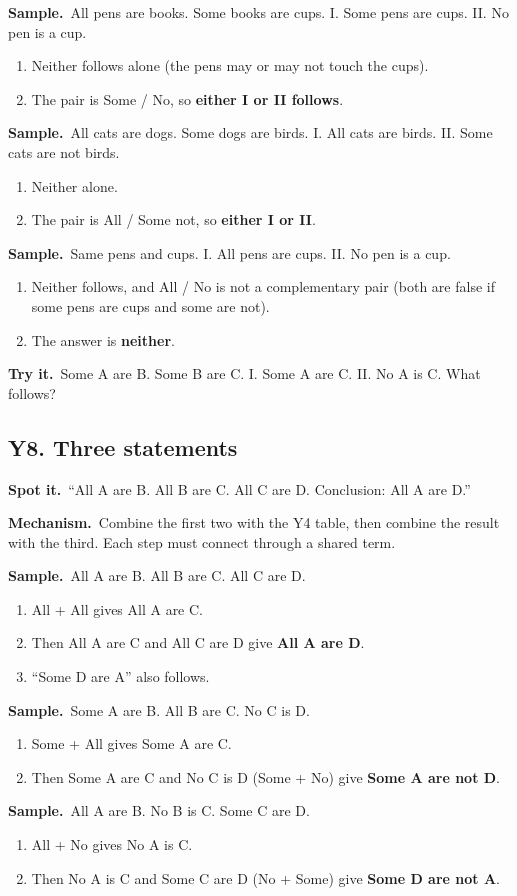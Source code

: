 \documentclass[11pt,a4paper]{article}
\let\oldsubsection\subsection
\renewcommand{\subsection}{\needspace{9\baselineskip}\oldsubsection}
\newcommand{\spot}{\textbf{\color{ember}Spot it.}\ }
\newcommand{\mech}{\textbf{\color{ember}Mechanism.}\ }
\newif\ifkeepsamp
\newcommand{\samp}{\ifkeepsamp\needspace{4\baselineskip}\fi\textbf{\color{ember}Sample.}\ }
\newcommand{\tryit}[1]{\textbf{\color{ember}Try it.}\ #1}
\begin{document}
\samp All pens are books. Some books are cups. I. Some pens are cups. II. No pen is a cup.
\begin{enumerate}
\item Neither follows alone (the pens may or may not touch the cups).
\item The pair is Some / No, so \textbf{either I or II follows}.
\end{enumerate}
\samp All cats are dogs. Some dogs are birds. I. All cats are birds. II. Some cats are not birds.
\begin{enumerate}
\item Neither alone.
\item The pair is All / Some not, so \textbf{either I or II}.
\end{enumerate}
\samp Same pens and cups. I. All pens are cups. II. No pen is a cup.
\begin{enumerate}
\item Neither follows, and All / No is not a complementary pair (both are false if some pens are cups and some are not).
\item The answer is \textbf{neither}.
\end{enumerate}

\tryit Some A are B. Some B are C. I. Some A are C. II. No A is C. What follows?

\subsection{Y8. Three statements}
\spot ``All A are B. All B are C. All C are D. Conclusion: All A are D.''

\mech Combine the first two with the Y4 table, then combine the result with the third. Each step must connect through a shared term.

\samp All A are B. All B are C. All C are D.
\begin{enumerate}
\item All + All gives All A are C.
\item Then All A are C and All C are D give \textbf{All A are D}.
\item ``Some D are A'' also follows.
\end{enumerate}
\samp Some A are B. All B are C. No C is D.
\begin{enumerate}
\item Some + All gives Some A are C.
\item Then Some A are C and No C is D (Some + No) give \textbf{Some A are not D}.
\end{enumerate}
\samp All A are B. No B is C. Some C are D.
\begin{enumerate}
\item All + No gives No A is C.
\item Then No A is C and Some C are D (No + Some) give \textbf{Some D are not A}.
\end{enumerate}
\end{document}

